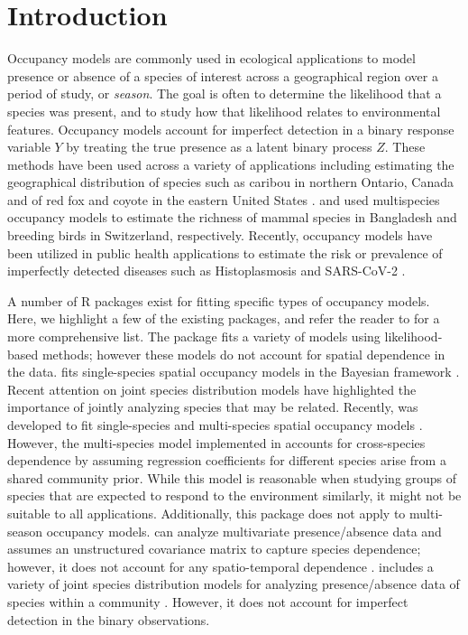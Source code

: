 \section{Introduction}

Occupancy models are commonly used in ecological applications to model presence or absence of a species of interest across a geographical region over a period of study, or \textit{season}. The goal is often to determine the likelihood that a species was present, and to study how that likelihood relates to environmental features. Occupancy models account for imperfect detection in a binary response variable $Y$ by treating the true presence as a latent binary process $Z$. These methods have been used across a variety of applications including estimating the geographical distribution of species such as caribou in northern Ontario, Canada \citep{johnson2013} and of red fox and coyote in the eastern United States \citep{rota2016}. \citet{rahman2021} and \citet{guillera2019} used multispecies occupancy models to estimate the richness of mammal species in Bangladesh and breeding birds in Switzerland, respectively. Recently, occupancy models have been utilized in public health applications to estimate the risk or prevalence of imperfectly detected diseases such as Histoplasmosis \citep{hepler2022histo} and SARS-CoV-2 \citep{sanderlin2021}. 

A number of R packages exist for fitting specific types of occupancy models. Here, we highlight a few of the existing packages, and refer the reader to \citet{doser2022spoccupancy} for a more comprehensive list. The package  fits a variety of models using likelihood-based methods; however these models do not account for spatial dependence in the data.  fits single-species spatial occupancy models in the Bayesian framework \citep{johnson2013}. Recent attention on joint species distribution models have highlighted the importance of jointly analyzing species that may be related. Recently,  was developed to fit single-species and multi-species spatial occupancy models \citep{doser2022spoccupancy}. However, the multi-species model implemented in  accounts for cross-species dependence by assuming regression coefficients for different species arise from a shared community prior. While this model is reasonable when studying groups of species that are expected to respond to the environment similarly, it might not be suitable to all applications. Additionally, this package does not apply to multi-season occupancy models.  can analyze multivariate presence/absence data and assumes an unstructured covariance matrix to capture species dependence; however, it does not account for any spatio-temporal dependence \citep{clark2017generalized}.   includes a variety of joint species distribution models for analyzing presence/absence data of species within a community \citep{tikhonov2020joint, ovaskainen2017make}. However, it does not account for imperfect detection in the binary observations. 

